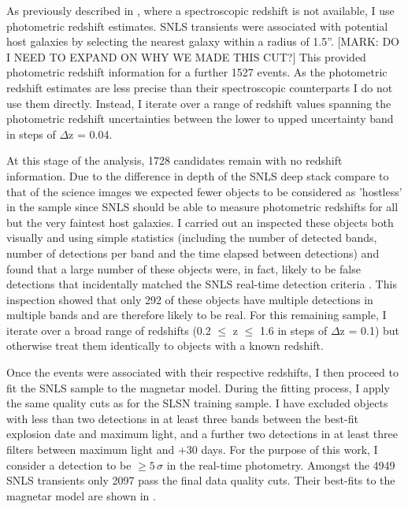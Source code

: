 As previously described in , where a spectroscopic redshift is not available, I use photometric redshift estimates. SNLS transients were associated with potential host galaxies by selecting the nearest galaxy within a radius of 1.5''. [MARK: DO I NEED TO EXPAND ON WHY WE MADE THIS CUT?] This provided photometric redshift information for a further 1527 events. As the photometric redshift estimates are less precise than their spectroscopic counterparts I do not use them directly. Instead, I iterate over a range of redshift values spanning the photometric redshift uncertainties between the lower to upped uncertainty band in steps of $\Delta$z = 0.04.

At this stage of the analysis, 1728 candidates remain with no redshift information. Due to the difference in depth of the SNLS deep stack compare to that of the science images we expected fewer objects to be considered as 'hostless' in the sample since SNLS should be able to measure photometric redshifts for all but the very faintest host galaxies. I carried out an inspected these objects both visually and using simple statistics (including the number of detected bands, number of detections per band and the time elapsed between detections) and found that a large number of these objects were, in fact, likely to be false detections that incidentally matched the SNLS real-time detection criteria \citep{Perrett2010}. This inspection showed that only 292 of these objects have multiple detections in multiple bands and are therefore likely to be real. For this remaining sample, I iterate over a broad range of redshifts (0.2 $\leq$ z $\leq$ 1.6 in steps of $\Delta$z = 0.1) but otherwise treat them identically to objects with a known redshift.

Once the events were associated with their respective redshifts, I then proceed to fit the SNLS sample to the magnetar model. During the fitting process, I apply the same quality cuts as for the SLSN training sample. I have excluded objects with less than two detections in at least three bands between the best-fit explosion date and maximum light, and a further two detections in at least three filters between maximum light and $+30$ days. For the purpose of this work, I consider a detection to be $\geq5$\,$\sigma$ in the real-time photometry. Amongst the 4949 SNLS transients only 2097 pass the final data quality cuts. Their best-fits to the magnetar model are shown in .

